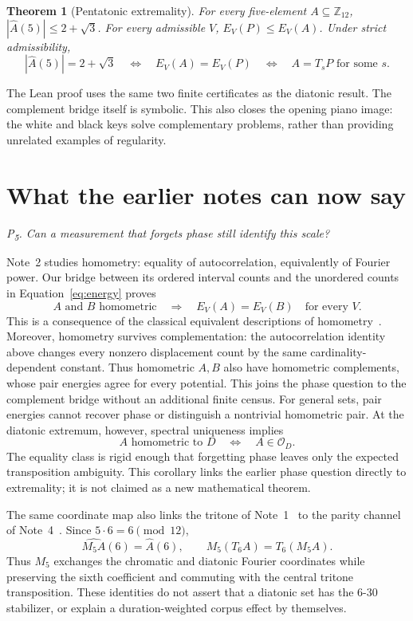 \documentclass[11pt]{article}
\newtheorem{theorem}{Theorem}
\newcommand{\Ztwelve}{\mathbb{Z}_{12}}
\newcommand{\Ahat}{\widehat A}
\newcommand{\question}[1]{\smallskip\noindent\textit{#1}\smallskip}
\newcommand{\orb}{\mathcal O_D}
\begin{document}
\begin{theorem}[Pentatonic extremality]\label{thm:pentatonic}
For every five-element $A\subseteq\Ztwelve$, $|\Ahat(5)|\le2+\sqrt3$.
For every admissible $V$, $E_V(P)\le E_V(A)$. Under strict admissibility,
\[
 |\Ahat(5)|=2+\sqrt3\quad\Longleftrightarrow\quad
 E_V(A)=E_V(P)\quad\Longleftrightarrow\quad A=T_sP\text{ for some }s.
\]
\end{theorem}

The Lean proof uses the same two finite certificates as the diatonic result.
The complement bridge itself is symbolic. This also closes the opening piano image:
the white and black keys solve complementary problems, rather than providing unrelated
examples of regularity.

\section{What the earlier notes can now say}\label{sec:earlier}

\question{P\textsubscript{5}. Can a measurement that forgets phase still identify this scale?}

Note~2 studies homometry: equality of autocorrelation, equivalently of Fourier power.
Our bridge between its ordered interval counts and the unordered counts in
Equation~\eqref{eq:energy} proves
\[
 A\text{ and }B\text{ homometric}\quad\Longrightarrow\quad E_V(A)=E_V(B)
 \quad\text{for every }V.
\]
This is a consequence of the classical equivalent descriptions of homometry~\cite{AS}.
Moreover, homometry survives complementation: the autocorrelation identity above
changes every nonzero displacement count by the same cardinality-dependent constant.
Thus homometric $A,B$ also have homometric complements, whose pair energies agree
for every potential. This joins the phase question to the complement bridge without
an additional finite census.
For general sets, pair energies cannot recover phase or distinguish a nontrivial
homometric pair. At the diatonic extremum, however, spectral uniqueness implies
\[
 A\text{ homometric to }D\quad\Longleftrightarrow\quad A\in\orb.
\]
The equality class is rigid enough that forgetting phase leaves only the expected
transposition ambiguity. This corollary links the earlier phase question directly
to extremality; it is not claimed as a new mathematical theorem.

The same coordinate map also links the tritone of Note~1~\cite{Tritone} to the parity channel of
Note~4~\cite{Voice}. Since $5\cdot6=6\pmod{12}$,
\[
 \widehat{M_5A}(6)=\Ahat(6),\qquad M_5(T_6A)=T_6(M_5A).
\]
Thus $M_5$ exchanges the chromatic and diatonic Fourier coordinates while preserving
the sixth coefficient and commuting with the central tritone transposition. These
identities do not assert that a diatonic set has the 6-30 stabilizer, or explain a
duration-weighted corpus effect by themselves.
\end{document}
